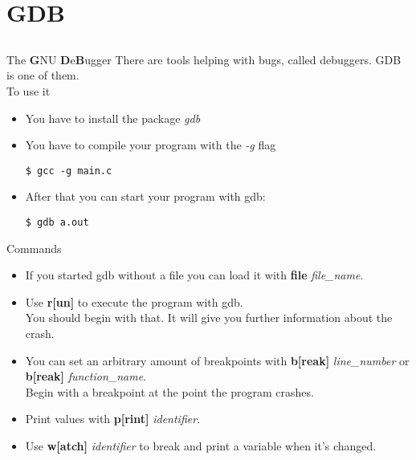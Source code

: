 \section{GDB}
\subsection{}
\begin{frame}[fragile]{The \textbf{G}NU \textbf{D}e\textbf{B}ugger}
	There are tools helping with bugs, called debuggers. GDB is one of them.\\
	\bigskip
	To use it
	\begin{itemize}
		\item You have to install the package \textit{gdb}\\
		\item You have to compile your program with the \textit{-g} flag
		\begin{lstlisting}[numbers=none]
$ gcc -g main.c
\end{lstlisting}
		\item After that you can start your program with gdb:
		\begin{lstlisting}[numbers=none]
$ gdb a.out
\end{lstlisting}
	\end{itemize}
\end{frame}
\begin{frame}{Commands}
	\begin{itemize}
		\item If you started gdb without a file you can load it with \textbf{file} \textit{file\_name}.
		\item Use \textbf{r[un]} to execute the program with gdb.\\
		You should begin with that. It will give you further information about the crash.
		\item You can set an arbitrary amount of breakpoints with \textbf{b[reak]} \textit{line\_number} or \textbf{b[reak]} \textit{function\_name}.\\
		Begin with a breakpoint at the point the program crashes.
		\item Print values with \textbf{p[rint]} \textit{identifier}.
		\item Use \textbf{w[atch]} \textit{identifier} to break and print a variable when it's changed.
	\end{itemize}
\end{frame}
